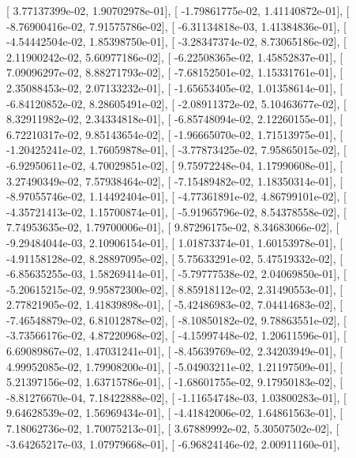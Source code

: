 \documentclass{article}
\begin{document}
       [  3.77137399e-02,   1.90702978e-01],
       [ -1.79861775e-02,   1.41140872e-01],
       [ -8.76900416e-02,   7.91575786e-02],
       [ -6.31134818e-03,   1.41384836e-01],
       [ -4.54442504e-02,   1.85398750e-01],
       [ -3.28347374e-02,   8.73065186e-02],
       [  2.11900242e-02,   5.60977186e-02],
       [ -6.22508365e-02,   1.45852837e-01],
       [  7.09096297e-02,   8.88271793e-02],
       [ -7.68152501e-02,   1.15331761e-01],
       [  2.35088453e-02,   2.07133232e-01],
       [ -1.65653405e-02,   1.01358614e-01],
       [ -6.84120852e-02,   8.28605491e-02],
       [ -2.08911372e-02,   5.10463677e-02],
       [  8.32911982e-02,   2.34334818e-01],
       [ -6.85748094e-02,   2.12260155e-01],
       [  6.72210317e-02,   9.85143654e-02],
       [ -1.96665070e-02,   1.71513975e-01],
       [ -1.20425241e-02,   1.76059878e-01],
       [ -3.77873425e-02,   7.95865015e-02],
       [ -6.92950611e-02,   4.70029851e-02],
       [  9.75972248e-04,   1.17990608e-01],
       [  3.27490349e-02,   7.57938464e-02],
       [ -7.15489482e-02,   1.18350314e-01],
       [ -8.97055746e-02,   1.14492404e-01],
       [ -4.77361891e-02,   4.86799101e-02],
       [ -4.35721413e-02,   1.15700874e-01],
       [ -5.91965796e-02,   8.54378558e-02],
       [  7.74953635e-02,   1.79700006e-01],
       [  9.87296175e-02,   8.34683066e-02],
       [ -9.29484044e-03,   2.10906154e-01],
       [  1.01873374e-01,   1.60153978e-01],
       [ -4.91158128e-02,   8.28897095e-02],
       [  5.75633291e-02,   5.47519332e-02],
       [ -6.85635255e-03,   1.58269414e-01],
       [ -5.79777538e-02,   2.04069850e-01],
       [ -5.20615215e-02,   9.95872300e-02],
       [  8.85918112e-02,   2.31490553e-01],
       [  2.77821905e-02,   1.41839898e-01],
       [ -5.42486983e-02,   7.04414683e-02],
       [ -7.46548879e-02,   6.81012878e-02],
       [ -8.10850182e-02,   9.78863551e-02],
       [ -3.73566176e-02,   4.87220968e-02],
       [ -4.15997448e-02,   1.20611596e-01],
       [  6.69089867e-02,   1.47031241e-01],
       [ -8.45639769e-02,   2.34203949e-01],
       [  4.99952085e-02,   1.79908200e-01],
       [ -5.04903211e-02,   1.21197509e-01],
       [  5.21397156e-02,   1.63715786e-01],
       [ -1.68601755e-02,   9.17950183e-02],
       [ -8.81276670e-04,   7.18422888e-02],
       [ -1.11654748e-03,   1.03800283e-01],
       [  9.64628539e-02,   1.56969434e-01],
       [ -4.41842006e-02,   1.64861563e-01],
       [  7.18062736e-02,   1.70075213e-01],
       [  3.67889992e-02,   5.30507502e-02],
       [ -3.64265217e-03,   1.07979668e-01],
       [ -6.96824146e-02,   2.00911160e-01],
\end{document}
